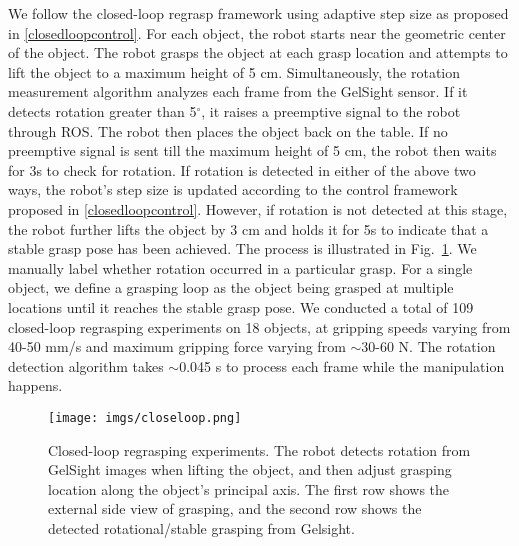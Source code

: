 We follow the closed-loop regrasp framework using adaptive step size as proposed in \ref{closedloopcontrol}. For each object, the robot starts near the geometric center of the object. The robot grasps the object at each grasp location and attempts to lift the object to a maximum height of 5 cm. Simultaneously, the rotation measurement algorithm analyzes each frame from the GelSight sensor. If it detects rotation greater than 5$^{\circ}$, it raises a preemptive signal to the robot through ROS. The robot then places the object back on the table. If no preemptive signal is sent till the maximum height of 5 cm, the robot then waits for 3s to check for rotation. If rotation is detected in either of the above two ways, the robot's step size is updated according to the control framework proposed in \ref{closedloopcontrol}. However, if rotation is not detected at this stage, the robot further lifts the object by 3 cm and holds it for 5s to indicate that a stable grasp pose has been achieved. The process is illustrated in Fig.~\ref{fig:location}. We manually label whether rotation occurred in a particular grasp. For a single object, we define a grasping loop as the object being grasped at multiple locations until it reaches the stable grasp pose. We conducted a total of 109 closed-loop regrasping experiments on 18 objects, at gripping speeds varying from 40-50 mm/s and maximum gripping force varying from $\sim$30-60 N. The rotation detection algorithm takes $\sim$0.045 s to process each frame while the manipulation happens.
\begin{figure}[!htbp]
    \centering
    \texttt{[image: imgs/closeloop.png]}
    \caption{Closed-loop regrasping experiments. The robot detects rotation from GelSight images when lifting the object, and then adjust grasping location along the object's principal axis. The first row shows the external side view of grasping, and the second row shows the detected rotational/stable grasping from Gelsight.}
    \label{fig:location}
     \vspace{-2mm}
\end{figure}

